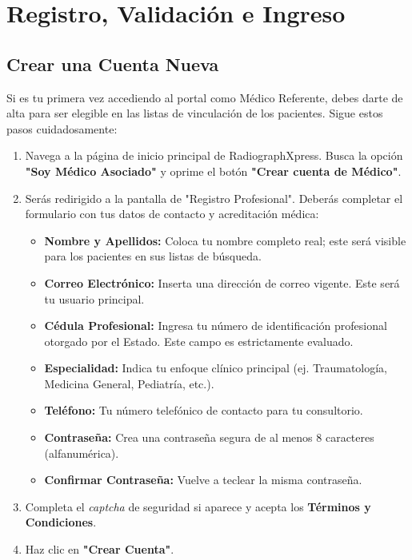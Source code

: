 \section{Registro, Validación e Ingreso}

\subsection{Crear una Cuenta Nueva}
Si es tu primera vez accediendo al portal como Médico Referente, debes darte de alta para ser elegible en las listas de vinculación de los pacientes. Sigue estos pasos cuidadosamente:

\begin{enumerate}
    \item Navega a la página de inicio principal de RadiographXpress. Busca la opción \textbf{"Soy Médico Asociado"} y oprime el botón \textbf{"Crear cuenta de Médico"}.
    \item Serás redirigido a la pantalla de "Registro Profesional". Deberás completar el formulario con tus datos de contacto y acreditación médica:
    \begin{itemize}
        \item \textbf{Nombre y Apellidos:} Coloca tu nombre completo real; este será visible para los pacientes en sus listas de búsqueda.
        \item \textbf{Correo Electrónico:} Inserta una dirección de correo vigente. Este será tu usuario principal.
        \item \textbf{Cédula Profesional:} Ingresa tu número de identificación profesional otorgado por el Estado. Este campo es estrictamente evaluado.
        \item \textbf{Especialidad:} Indica tu enfoque clínico principal (ej. Traumatología, Medicina General, Pediatría, etc.).
        \item \textbf{Teléfono:} Tu número telefónico de contacto para tu consultorio.
        \item \textbf{Contraseña:} Crea una contraseña segura de al menos 8 caracteres (alfanumérica).
        \item \textbf{Confirmar Contraseña:} Vuelve a teclear la misma contraseña.
    \end{itemize}
    \item Completa el \textit{captcha} de seguridad si aparece y acepta los \textbf{Términos y Condiciones}.
    \item Haz clic en \textbf{"Crear Cuenta"}. 
\end{enumerate}

